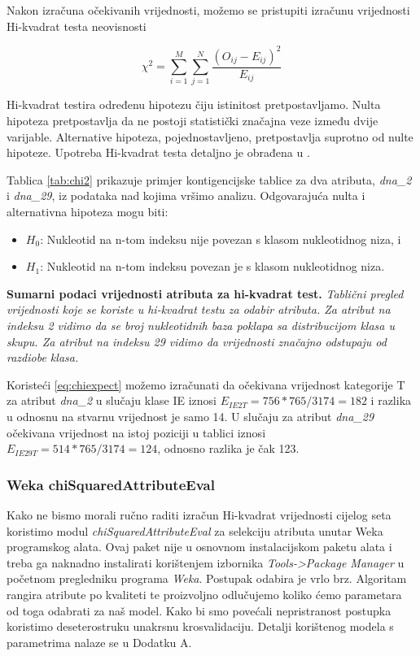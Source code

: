 Nakon izračuna očekivanih vrijednosti, možemo se pristupiti izračunu vrijednosti Hi-kvadrat testa neovisnosti

\begin{equation}
    \chi^2 = \sum_{i=1}^{M}\sum_{j=1}^{N}\frac{(O_{ij}-E_{ij})^2}{E_{ij}}
\end{equation}

Hi-kvadrat testira određenu hipotezu čiju istinitost pretpostavljamo. Nulta hipoteza pretpostavlja da ne postoji statistički značajna veze između dvije varijable. Alternative hipoteza, pojednostavljeno, pretpostavlja suprotno od nulte hipoteze. Upotreba Hi-kvadrat testa detaljno je obrađena u \cite{Grubi01}.

Tablica \ref{tab:chi2} prikazuje primjer kontigencijske tablice za dva atributa, \textit{dna{\_2}} i \textit{dna{\_}29}, iz podataka nad kojima vršimo analizu. Odgovarajuća nulta i alternativna hipoteza mogu biti:
\begin{itemize}
    \item $H_0$: Nukleotid na n-tom indeksu nije povezan s klasom nukleotidnog niza, i 
    \item $H_1$: Nukleotid na n-tom indeksu povezan je s klasom nukleotidnog niza.
\end{itemize}

\begin{table}
\centering
    \caption[Sumarni podaci vrijednosti atributa za hi-kvadrat test]{\textbf{Sumarni podaci vrijednosti atributa za hi-kvadrat test.} \textit{Tablični pregled vrijednosti koje se koriste u hi-kvadrat testu za odabir atributa. Za atribut na indeksu 2 vidimo da se broj nukleotidnih baza poklapa sa distribucijom klasa u skupu. Za atribut na indeksu 29 vidimo da vrijednosti značajno odstupaju od razdiobe klasa.}}
    \label{tab:chi2}
\end{table}
Koristeći \eqref{eq:chiexpect} možemo izračunati da očekivana vrijednost kategorije T za atribut \textit{dna{\_}2} u slučaju klase IE iznosi $E_{IE2T} = 756*765/3174 = 182$ i razlika u odnosnu na stvarnu vrijednost je samo 14. U slučaju za atribut \textit{dna{\_}29} očekivana vrijednost na istoj poziciji u tablici iznosi $E_{IE29T} = 514*765/3174 = 124$, odnosno razlika je čak 123.

\subsubsection*{Weka chiSquaredAttributeEval}
Kako ne bismo morali ručno raditi izračun Hi-kvadrat vrijednosti cijelog seta koristimo modul \textit{chiSquaredAttributeEval} za selekciju atributa unutar Weka programskog alata. Ovaj paket nije u osnovnom instalacijskom paketu alata i treba ga naknadno instalirati korištenjem izbornika \textit{Tools->Package Manager} u početnom pregledniku programa \textit{Weka}. Postupak odabira je vrlo brz. Algoritam rangira atribute po kvaliteti te proizvoljno odlučujemo koliko ćemo parametara od toga odabrati za naš model. Kako bi smo povećali nepristranost postupka koristimo deseterostruku unakrsnu krosvalidaciju. Detalji korištenog modela s parametrima nalaze se u Dodatku A. 

